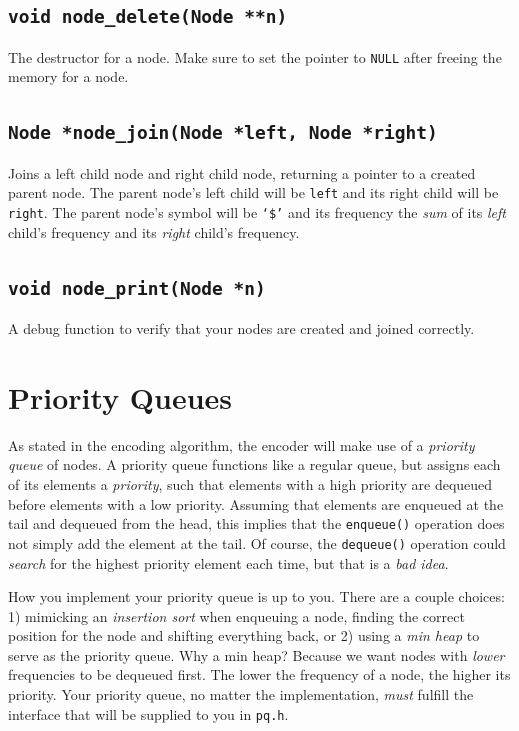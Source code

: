 \documentclass[11pt]{article}
\begin{document}
\subsection{\texttt{void node\_delete(Node **n)}}

The destructor for a node. Make sure to set the pointer to \texttt{NULL}
after freeing the memory for a node.

\subsection{\texttt{Node *node\_join(Node *left, Node *right)}}

Joins a left child node and right child node, returning a pointer to a
created parent node. The parent node's left child will be
\texttt{left} and its right child will be \texttt{right}. The parent
node's symbol will be \texttt{`\$'} and its frequency the \emph{sum} of
its \emph{left} child's frequency and its \emph{right} child's
frequency.

\subsection{\texttt{void node\_print(Node *n)}}

A debug function to verify that your nodes are created and joined
correctly.

\section{Priority Queues}

As stated in the encoding algorithm, the encoder will make use of a
\emph{priority queue} of nodes. A priority queue functions like a
regular queue, but assigns each of its elements a \emph{priority}, such
that elements with a high priority are dequeued before elements with a
low priority. Assuming that elements are enqueued at the tail and
dequeued from the head, this implies that the \texttt{enqueue()}
operation does not simply add the element at the tail. Of course, the
\texttt{dequeue()} operation could \emph{search} for the highest
priority element each time, but that is a \emph{bad idea}.

How you implement your priority queue is up to you. There are a couple
choices: 1) mimicking an \emph{insertion sort} when enqueuing a node,
finding the correct position for the node and shifting everything back,
or 2) using a \emph{min heap} to serve as the priority queue. Why a min
heap? Because we want nodes with \emph{lower} frequencies to be
dequeued first. The lower the frequency of a node, the higher its
priority. Your priority queue, no matter the implementation, \emph{must}
fulfill the interface that will be supplied to you in \texttt{pq.h}.
\end{document}
